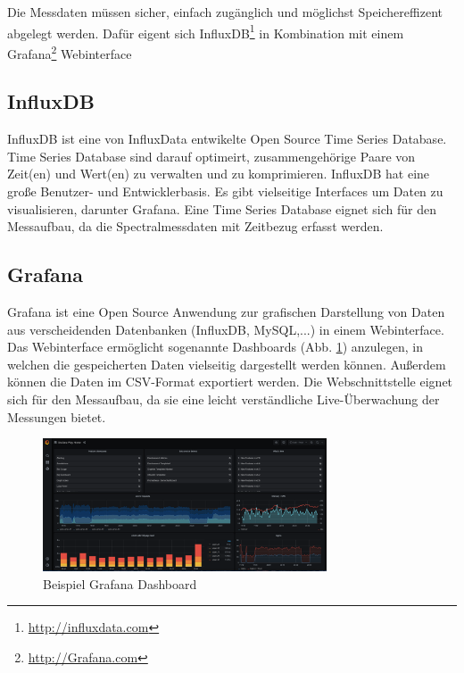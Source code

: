 Die Messdaten müssen sicher, einfach zugänglich und möglichst Speichereffizent abgelegt werden.
Dafür eigent sich InfluxDB\footnote{\url{http://influxdata.com}} in Kombination mit einem Grafana\footnote{\url{http://Grafana.com}} Webinterface
\subsection{InfluxDB}\label{datenbankundinterface}
InfluxDB ist eine von InfluxData entwikelte Open Source Time Series Database. 
Time Series Database  sind darauf optimeirt, zusammengehörige Paare von Zeit(en) und Wert(en) zu verwalten und zu komprimieren.
InfluxDB hat eine große Benutzer- und Entwicklerbasis. Es gibt vielseitige Interfaces um Daten zu visualisieren, darunter Grafana.
Eine Time Series Database eignet sich für den Messaufbau, da die Spectralmessdaten mit Zeitbezug erfasst werden.

\subsection{Grafana}
Grafana ist eine Open Source Anwendung zur grafischen Darstellung von Daten aus verscheidenden Datenbanken (InfluxDB,  MySQL,...) in einem Webinterface.
Das Webinterface ermöglicht sogenannte Dashboards (Abb. \ref{fig:Beispiel_Grafana_Dashboard}) anzulegen, in welchen die gespeicherten Daten vielseitig dargestellt werden können.
Außerdem können die Daten im CSV-Format exportiert werden.
Die Webschnittstelle eignet sich für den Messaufbau, da sie eine leicht verständliche Live-Überwachung der Messungen bietet.
\begin{figure}[ht!]
\centering
\includegraphics[width=0.75\textwidth]{img/Beispiel_Grafana_Dashboard}
\caption{Beispiel Grafana Dashboard}
\label{fig:Beispiel_Grafana_Dashboard}
\end{figure}